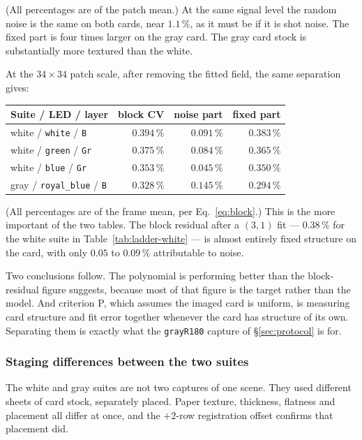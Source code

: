 \documentclass[11pt, a4paper]{article}
\newcommand{\code}[1]{\texttt{#1}}
\newcommand{\pct}{\,\%}
\begin{document}
(All percentages are of the patch mean.)
At the same signal level the random noise is the same on both cards,
near $1.1\pct$,
as it must be if it is shot noise.
The fixed part is four times larger on the gray card.
The gray card stock is substantially more textured than the white.

At the $34\times34$ patch scale,
after removing the fitted field,
the same separation gives:

\begin{center}
\begin{tabular}{lrrr}
\toprule
Suite / LED / layer & block CV & noise part & fixed part \\
\midrule
white / \code{white} / \code{B}      & $0.394\pct$ & $0.091\pct$ & $0.383\pct$ \\
white / \code{green} / \code{Gr}     & $0.375\pct$ & $0.084\pct$ & $0.365\pct$ \\
white / \code{blue} / \code{Gr}      & $0.353\pct$ & $0.045\pct$ & $0.350\pct$ \\
gray / \code{royal\_blue} / \code{B} & $0.328\pct$ & $0.145\pct$ & $0.294\pct$ \\
\bottomrule
\end{tabular}
\end{center}

(All percentages are of the frame mean, per Eq.~\ref{eq:block}.)
This is the more important of the two tables.
The block residual after a $(3,1)$ fit ---
$0.38\pct$ for the white suite in Table~\ref{tab:ladder-white} ---
is almost entirely fixed structure on the card,
with only $0.05$ to $0.09\pct$ attributable to noise.

Two conclusions follow.
The polynomial is performing better than the block-residual figure
suggests,
because most of that figure is the target rather than the model.
And criterion P, which assumes the imaged card is uniform,
is measuring card structure and fit error together
whenever the card has structure of its own.
Separating them is exactly what the \code{grayR180} capture of
\S\ref{sec:protocol} is for.

\subsubsection{Staging differences between the two suites}
\label{sec:staging}

The white and gray suites are not two captures of one scene.
They used different sheets of card stock, separately placed.
Paper texture, thickness, flatness and placement all differ at once,
and the $+2$-row registration offset confirms that placement did.
\end{document}

